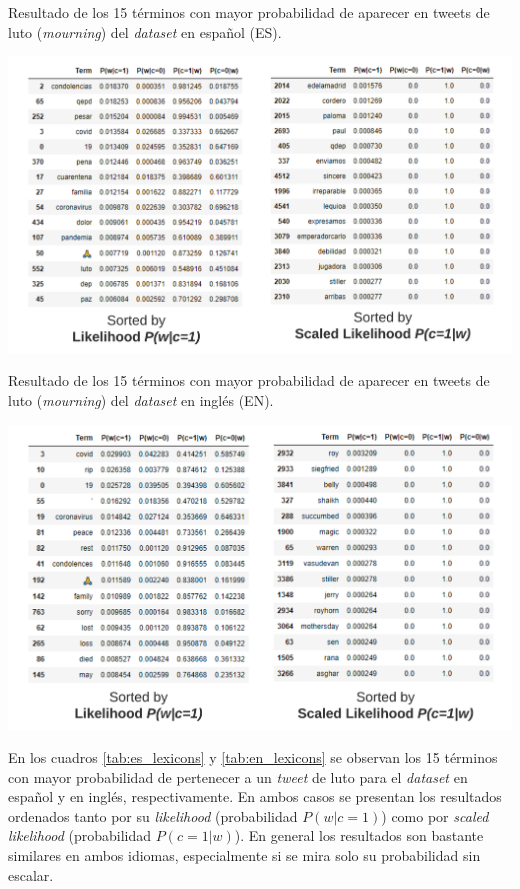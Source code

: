 \begin{table}[H]
    \centering
    \caption{Resultado de los 15 términos con mayor probabilidad de aparecer en tweets de luto (\textit{mourning}) del \textit{dataset} en español (ES).}
    \label{tab:es_lexicons}
    \includegraphics[width=\textwidth]{doc/images/ES_Lexicons.png}
\end{table}

\begin{table}[H]
    \centering
    \caption{Resultado de los 15 términos con mayor probabilidad de aparecer en tweets de luto (\textit{mourning}) del \textit{dataset} en inglés (EN).}
    \label{tab:en_lexicons}
    \includegraphics[width=\textwidth]{doc/images/EN_Lexicons.png}
\end{table}

En los cuadros \ref{tab:es_lexicons} y \ref{tab:en_lexicons} se observan los 15 términos con mayor probabilidad de pertenecer a un \textit{tweet} de luto para el \textit{dataset} en español y en inglés, respectivamente. En ambos casos se presentan los resultados ordenados tanto por su \textit{likelihood} (probabilidad $P(w|c=1)$) como por \textit{scaled likelihood} (probabilidad $P(c=1|w)$). En general los resultados son bastante similares en ambos idiomas, especialmente si se mira solo su probabilidad sin escalar. \\

